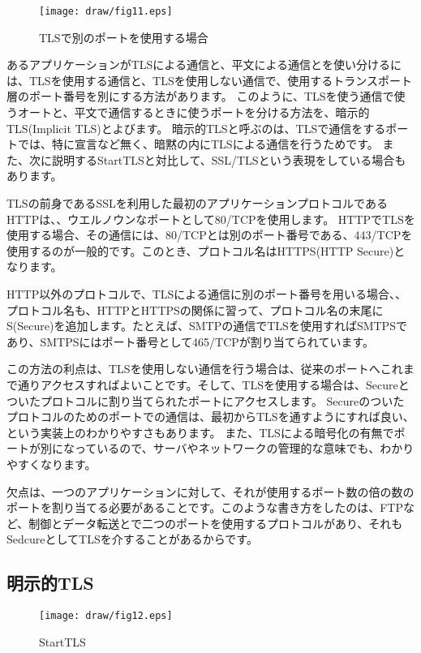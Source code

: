 \begin{figure}[htbp]
	\texttt{[image: draw/fig11.eps]}
	\caption{TLSで別のポートを使用する場合}
	\label{fig:other_port}
\end{figure}


あるアプリケーションがTLSによる通信と、平文による通信とを使い分けるには、TLSを使用する通信と、TLSを使用しない通信で、使用するトランスポート層のポート番号を別にする方法があります。
このように、TLSを使う通信で使うオートと、平文で通信するときに使うポートを分ける方法を、暗示的TLS(Implicit TLS)とよびます。
暗示的TLSと呼ぶのは、TLSで通信をするポートでは、特に宣言など無く、暗黙の内にTLSによる通信を行うためです。
また、次に説明するStartTLSと対比して、SSL/TLSという表現をしている場合もあります。

TLSの前身であるSSLを利用した最初のアプリケーションプロトコルであるHTTPは、、ウエルノウンなポートとして80/TCPを使用します。
HTTPでTLSを使用する場合、その通信には、80/TCPとは別のポート番号である、443/TCPを使用するのが一般的です。このとき、プロトコル名はHTTPS(HTTP Secure)となります。

HTTP以外のプロトコルで、TLSによる通信に別のポート番号を用いる場合、、プロトコル名も、HTTPとHTTPSの関係に習って、プロトコル名の末尾にS(Secure)を追加します。たとえば、SMTPの通信でTLSを使用すればSMTPSであり、SMTPSにはポート番号として465/TCPが割り当てられています。

この方法の利点は、TLSを使用しない通信を行う場合は、従来のポートへこれまで通りアクセスすればよいことです。そして、TLSを使用する場合は、Secureとついたプロトコルに割り当てられたポートにアクセスします。
Secureのついたプロトコルのためのポートでの通信は、最初からTLSを通すようにすれば良い、という実装上のわかりやすさもあります。
また、TLSによる暗号化の有無でポートが別になっているので、サーバやネットワークの管理的な意味でも、わかりやすくなります。

欠点は、一つのアプリケーションに対して、それが使用するポート数の倍の数のポートを割り当てる必要があることです。このような書き方をしたのは、FTPなど、制御とデータ転送とで二つのポートを使用するプロトコルがあり、それもSedcureとしてTLSを介することがあるからです。

\subsection{明示的TLS}

\begin{figure}[htbp]
	\texttt{[image: draw/fig12.eps]}
	\caption{StartTLS}
	\label{fig:starttls}
\end{figure}


